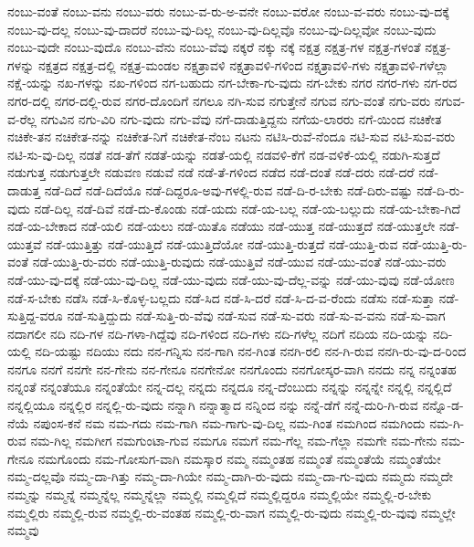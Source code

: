 {ನಂಬು-ವಂತೆ
ನಂಬು-ವನು
ನಂಬು-ವರು
ನಂಬು-ವ-ರು-ಅ-ವನೇ
ನಂಬು-ವರೋ
ನಂಬು-ವ-ವರು
ನಂಬು-ವು-ದಕ್ಕೆ
ನಂಬು-ವು-ದಲ್ಲ
ನಂಬು-ವು-ದಾದರೆ
ನಂಬು-ವು-ದಿಲ್ಲ
ನಂಬು-ವು-ದಿಲ್ಲವೊ
ನಂಬು-ವು-ದಿಲ್ಲವೋ
ನಂಬು-ವುದು
ನಂಬು-ವುದೇ
ನಂಬು-ವುದೊ
ನಂಬು-ವೆನು
ನಂಬು-ವೆವು
ನಕ್ಕರೆ
ನಕ್ಕು
ನಕ್ಕೆ
ನಕ್ಷತ್ರ
ನಕ್ಷತ್ರ-ಗಳ
ನಕ್ಷತ್ರ-ಗಳಂತೆ
ನಕ್ಷತ್ರ-ಗಳನ್ನು
ನಕ್ಷತ್ರದ
ನಕ್ಷತ್ರ-ದಲ್ಲಿ
ನಕ್ಷತ್ರ-ಮಂಡಲ
ನಕ್ಷತ್ರಾವಳಿ
ನಕ್ಷತ್ರಾವಳಿ-ಗಳಿಂದ
ನಕ್ಷತ್ರಾವಳಿ-ಗಳು
ನಕ್ಷತ್ರಾವಳಿ-ಗಳೆಲ್ಲಾ
ನಕ್ಷೆ-ಯನ್ನು
ನಖ-ಗಳನ್ನು
ನಖ-ಗಳಿಂದ
ನಗ-ಬಹುದು
ನಗ-ಬೇಕಾ-ಗು-ವುದು
ನಗ-ಬೇಕು
ನಗರ
ನಗರ-ಗಳು
ನಗ-ರದ
ನಗರ-ದಲ್ಲಿ
ನಗರ-ದಲ್ಲಿ-ರುವ
ನಗರ-ದೊಂದಿಗೆ
ನಗಲೂ
ನಗಿ-ಸುವ
ನಗುತ್ತೇನೆ
ನಗುವ
ನಗು-ವಂತೆ
ನಗು-ವರು
ನಗುವ-ವ-ರೆಲ್ಲ
ನಗುವಿನ
ನಗು-ವಿರಿ
ನಗು-ವುದು
ನಗು-ವೆವು
ನಗೆ-ದಾಡುತ್ತಿದ್ದನು
ನಗೆಯ-ಲಾರರು
ನಗೆ-ಯಿಂದ
ನಚಿಕೇತ
ನಚಿಕೇ-ತನ
ನಚಿಕೇತ-ನನ್ನು
ನಚಿಕೇತ-ನಿಗೆ
ನಚಿಕೇತ-ನೆಂಬ
ನಟನು
ನಟಿಸಿ-ರುವೆ-ನೆಂದೂ
ನಟಿ-ಸುವ
ನಟಿ-ಸುವ-ವರು
ನಟಿ-ಸು-ವು-ದಿಲ್ಲ
ನಡತೆ
ನಡ-ತೆಗೆ
ನಡತೆ-ಯನ್ನು
ನಡತೆ-ಯಲ್ಲಿ
ನಡವಳಿ-ಕೆಗೆ
ನಡ-ವಳಿಕೆ-ಯಲ್ಲಿ
ನಡುಗಿ-ಸುತ್ತದೆ
ನಡುಗುತ್ತ
ನಡುಗುತ್ತಲೇ
ನಡುವಣ
ನಡುವೆ
ನಡೆ
ನಡೆ-ತೆ-ಗಳಿಂದ
ನಡೆದ
ನಡೆ-ದಂತೆ
ನಡೆ-ದರು
ನಡೆ-ದರೆ
ನಡೆ-ದಾಡುತ್ತ
ನಡೆ-ದಿದೆ
ನಡೆ-ದಿದೆಯೊ
ನಡೆ-ದಿದ್ದರೂ-ಅವು-ಗಳಲ್ಲಿ-ರುವ
ನಡೆ-ದಿ-ರ-ಬೇಕು
ನಡೆ-ದಿರು-ವಷ್ಟು
ನಡೆ-ದಿ-ರು-ವುದು
ನಡೆ-ದಿಲ್ಲ
ನಡೆ-ದಿವೆ
ನಡೆ-ದು-ಕೊಂಡು
ನಡೆ-ಯದು
ನಡೆ-ಯ-ಬಲ್ಲ
ನಡೆ-ಯ-ಬಲ್ಲುದು
ನಡೆ-ಯ-ಬೇಕಾ-ಗಿದೆ
ನಡೆ-ಯ-ಬೇಕಾದ
ನಡೆ-ಯಲಿ
ನಡೆ-ಯಲು
ನಡೆ-ಯಿತೊ
ನಡೆಯು
ನಡೆ-ಯುತ್ತ
ನಡೆ-ಯುತ್ತದೆ
ನಡೆ-ಯುತ್ತಲೇ
ನಡೆ-ಯುತ್ತವೆ
ನಡೆ-ಯುತ್ತಿತ್ತು
ನಡೆ-ಯುತ್ತಿದೆ
ನಡೆ-ಯುತ್ತಿದೆಯೋ
ನಡೆ-ಯುತ್ತಿ-ರುತ್ತದೆ
ನಡೆ-ಯುತ್ತಿ-ರುವ
ನಡೆ-ಯುತ್ತಿ-ರು-ವಂತೆ
ನಡೆ-ಯುತ್ತಿ-ರು-ವರು
ನಡೆ-ಯುತ್ತಿ-ರುವುದು
ನಡೆ-ಯುತ್ತಿವೆ
ನಡೆ-ಯುವ
ನಡೆ-ಯು-ವಂತೆ
ನಡೆ-ಯು-ವರು
ನಡೆ-ಯು-ವು-ದಕ್ಕೆ
ನಡೆ-ಯು-ವು-ದಿಲ್ಲ
ನಡೆ-ಯು-ವುದು
ನಡೆ-ಯು-ವು-ದೆಲ್ಲ-ವನ್ನು
ನಡೆ-ಯು-ವುವು
ನಡೆ-ಯೋಣ
ನಡೆ-ಸ-ಬೇಕು
ನಡೆಸಿ
ನಡೆ-ಸಿ-ಕೊಳ್ಳ-ಬಲ್ಲದು
ನಡೆ-ಸಿದ
ನಡೆ-ಸಿ-ದರೆ
ನಡೆ-ಸಿ-ದ-ವ-ರೆಂದು
ನಡೆಸು
ನಡೆ-ಸುತ್ತಾ
ನಡೆ-ಸುತ್ತಿದ್ದ-ವರೂ
ನಡೆ-ಸುತ್ತಿದ್ದುದು
ನಡೆ-ಸುತ್ತಿ-ರು-ವೆವು
ನಡೆ-ಸುವ
ನಡೆ-ಸು-ವರು
ನಡೆ-ಸು-ವ-ವನು
ನಡೆ-ಸು-ವಾಗ
ನದಾಗಲೀ
ನದಿ
ನದಿ-ಗಳ
ನದಿ-ಗಳಾ-ಗಿದ್ದೆವು
ನದಿ-ಗಳಿಂದ
ನದಿ-ಗಳು
ನದಿ-ಗಳೆಲ್ಲ
ನದಿಗೆ
ನದಿಯ
ನದಿ-ಯನ್ನು
ನದಿ-ಯಲ್ಲಿ
ನದಿ-ಯಷ್ಟು
ನದಿಯು
ನದು
ನನ-ಗನ್ನಿಸು
ನನ-ಗಾಗಿ
ನನ-ಗಿಂತ
ನನಗಿ-ರಲಿ
ನನ-ಗಿ-ರುವ
ನನಗಿ-ರು-ವು-ದ-ರಿಂದ
ನನಗೂ
ನನಗೆ
ನನಗೇ
ನನ-ಗೇನು
ನನ-ಗೇನೂ
ನನಗೇನೋ
ನನಗೊಂದು
ನನಗೋಸ್ಕರ-ವಾಗಿ
ನನದು
ನನ್ನ
ನನ್ನಂತಹ
ನನ್ನಂತೆ
ನನ್ನಂತೆಯೂ
ನನ್ನಂತೆಯೇ
ನನ್ನ-ದಲ್ಲ
ನನ್ನದು
ನನ್ನದೂ
ನನ್ನ-ದೆಂಬುದು
ನನ್ನನ್ನು
ನನ್ನನ್ನೇ
ನನ್ನಲ್ಲಿ
ನನ್ನಲ್ಲಿದೆ
ನನ್ನಲ್ಲಿಯೂ
ನನ್ನಲ್ಲಿರ
ನನ್ನಲ್ಲಿ-ರು-ವುದು
ನನ್ನಾಗಿ
ನನ್ನಾತ್ಮಾದ
ನನ್ನಿಂದ
ನನ್ನು
ನನ್ನೆ-ಡೆಗೆ
ನನ್ನೆ-ದುರಿ-ಗಿ-ರುವ
ನನ್ನೊ-ಡ-ನೆಯೆ
ನಪುಂಸ-ಕನೆ
ನಮ
ನಮ-ಗದು
ನಮ-ಗಾಗಿ
ನಮ-ಗಾಗು-ವು-ದಿಲ್ಲ
ನಮ-ಗಿಂತ
ನಮಗಿಂದ
ನಮಗಿಂದು
ನಮ-ಗಿ-ರುವ
ನಮ-ಗಿಲ್ಲ
ನಮಗೀಗ
ನಮಗುಂಟಾ-ಗುವ
ನಮಗೂ
ನಮಗೆ
ನಮ-ಗೆಲ್ಲ
ನಮ-ಗೆಲ್ಲಾ
ನಮಗೇ
ನಮ-ಗೇನು
ನಮ-ಗೇನೂ
ನಮಗೊಂದು
ನಮ-ಗೋಸುಗ-ವಾಗಿ
ನಮಸ್ಕಾರ
ನಮ್ಮ
ನಮ್ಮಂತಹ
ನಮ್ಮಂತೆ
ನಮ್ಮಂತೆಯೆ
ನಮ್ಮಂತೆಯೇ
ನಮ್ಮ-ದಲ್ಲವೊ
ನಮ್ಮ-ದಾ-ಗಿತ್ತು
ನಮ್ಮ-ದಾ-ಗಿಯೇ
ನಮ್ಮ-ದಾಗಿ-ರು-ವುದು
ನಮ್ಮ-ದಾ-ಗು-ವುದು
ನಮ್ಮದು
ನಮ್ಮದೇ
ನಮ್ಮನ್ನು
ನಮ್ಮನ್ನೆ
ನಮ್ಮನ್ನೆಲ್ಲ
ನಮ್ಮನ್ನೆಲ್ಲಾ
ನಮ್ಮಲ್ಲಿ
ನಮ್ಮಲ್ಲಿದೆ
ನಮ್ಮಲ್ಲಿದ್ದರೂ
ನಮ್ಮಲ್ಲಿಯೇ
ನಮ್ಮಲ್ಲಿ-ರ-ಬೇಕು
ನಮ್ಮಲ್ಲಿರು
ನಮ್ಮಲ್ಲಿ-ರುವ
ನಮ್ಮಲ್ಲಿ-ರು-ವಂತಹ
ನಮ್ಮಲ್ಲಿ-ರು-ವಾಗ
ನಮ್ಮಲ್ಲಿ-ರು-ವುದು
ನಮ್ಮಲ್ಲಿ-ರು-ವುವು
ನಮ್ಮಲ್ಲೇ
ನಮ್ಮವು
}
